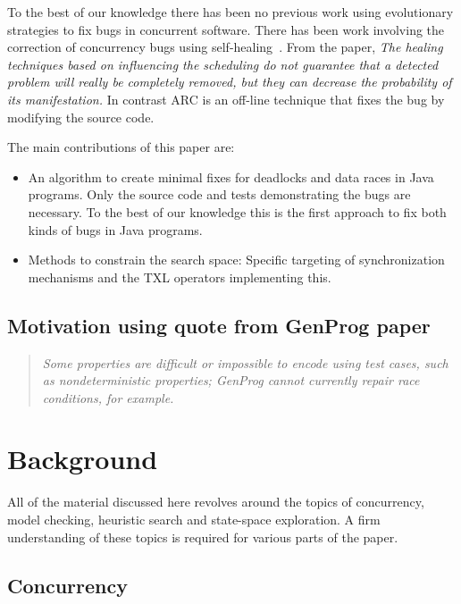 \documentclass[10pt, conference, compsocconf]{IEEEtran}
\begin{document}
To the best of our knowledge there has been no previous work using evolutionary
strategies to fix bugs in concurrent software.  There has been work involving
the correction of concurrency bugs using self-healing~\cite{LVK08}. From the
paper, \textit{The healing techniques based on influencing the scheduling do
not guarantee that a detected problem will really be completely removed, but
they can decrease the probability of its manifestation.} In contrast ARC is an
off-line technique that fixes the bug by modifying the source code.

The main contributions of this paper are:

\begin{itemize}

\item An algorithm to create minimal fixes for deadlocks and data races in Java
programs. Only the source code and tests demonstrating the bugs are necessary.
To the best of our knowledge this is the first approach to fix both kinds of
bugs in Java programs.

\item Methods to constrain the search space: Specific targeting of
synchronization mechanisms and the TXL operators implementing this.

\end{itemize}


\subsection{Motivation using quote from GenProg paper}
\begin{quote}\textit{Some properties are difficult or impossible to encode
using test cases, such as nondeterministic properties; GenProg cannot
currently repair race conditions, for example.}~\cite{GNFW11}
\end{quote}

\section{Background}
\label{sec:background}

All of the material discussed here revolves around the topics of concurrency,
model checking, heuristic search and state-space exploration. A firm
understanding of these topics is required for various parts of the paper.

\subsection{Concurrency}
\label{sec:concurrency}
\end{document}
